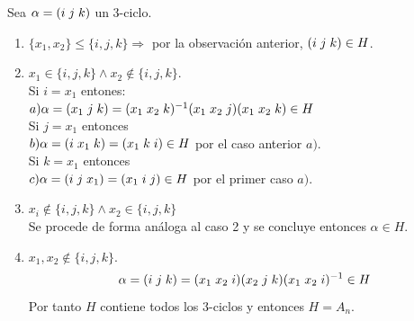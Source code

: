 \documentclass[11pt,a4paper]{article}
\begin{document}
Sea $\alpha = (i \hspace{0.1cm} j \hspace{0.1cm} k)$ un 3-ciclo.
\begin{enumerate}[label = Caso \arabic*:]
\item $\{x_{1}, x_{2}\} \leqslant \{i, j, k\} \Rightarrow$ por la observación anterior, $(i \hspace{0.1cm} j \hspace{0.1cm} k) \in H$.
\item $x_{1} \in \{i, j, k\} \wedge x_{2} \notin \{i, j, k\}$. \\
Si $i = x_{1}$ entones: \\
$a) \alpha = (x_{1} \hspace{0.1cm} j \hspace{0.1cm} k) = (x_{1} \hspace{0.1cm} x_{2} \hspace{0.1cm} k)^{-1}(x_{1} \hspace{0.1cm} x_{2} \hspace{0.1cm} j)(x_{1} \hspace{0.1cm} x_{2} \hspace{0.1cm} k) \in H$ \\
Si $j = x_{1}$ entonces \\
$b) \alpha = (i \hspace{0.1cm} x_{1} \hspace{0.1cm} k) = (x_{1} \hspace{0.1cm} k \hspace{0.1cm} i) \in H$ por el caso anterior $a)$. \\
Si $k = x_{1}$ entonces \\
$c) \alpha = (i \hspace{0.1cm} j \hspace{0.1cm} x_{1}) = (x_{1} \hspace{0.1cm} i \hspace{0.1cm} j) \in H$ por el primer caso $a)$.
\item $x_{i} \notin \{i, j, k\} \wedge x_{2} \in \{i,j,k\}$ \\
Se procede de forma análoga al caso 2 y se concluye entonces $\alpha \in H$.
\item $x_{1}, x_{2} \notin \{i, j, k\}$.
$$\alpha = (i \hspace{0.1cm} j \hspace{0.1cm} k) = (x_{1} \hspace{0.1cm} x_{2} \hspace{0.1cm} i) (x_{2} \hspace{0.1cm} j \hspace{0.1cm} k) (x_{1} \hspace{0.1cm} x_{2} \hspace{0.1cm} i)^{-1} \in H$$
Por tanto $H$ contiene todos los 3-ciclos y entonces $H = A_{n}$.
\end{enumerate}
\end{document}
